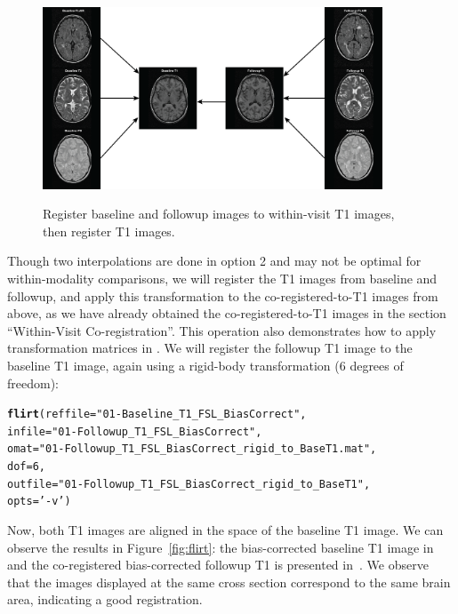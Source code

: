 \documentclass[a4paper]{report}\usepackage[]{graphicx}\usepackage[]{color}
\makeatletter
\newcommand{\hlnum}[1]{\textcolor[rgb]{0.686,0.059,0.569}{#1}}%
\newcommand{\hlstr}[1]{\textcolor[rgb]{0.192,0.494,0.8}{#1}}%
\newcommand{\hlstd}[1]{\textcolor[rgb]{0.345,0.345,0.345}{#1}}%
\newcommand{\hlkwc}[1]{\textcolor[rgb]{0.333,0.667,0.333}{#1}}%
\newcommand{\hlkwd}[1]{\textcolor[rgb]{0.737,0.353,0.396}{\textbf{#1}}}%
\newenvironment{kframe}{%
 \def\at@end@of@kframe{}%
 \ifinner\ifhmode%
  \def\at@end@of@kframe{\end{minipage}}%
  \begin{minipage}{\columnwidth}%
 \fi\fi%
 \def\FrameCommand##1{\hskip\@totalleftmargin \hskip-\fboxsep
 \colorbox{shadecolor}{##1}\hskip-\fboxsep
     \hskip-\linewidth \hskip-\@totalleftmargin \hskip\columnwidth}%
 \MakeFramed {\advance\hsize-\width
   \@totalleftmargin\z@ \linewidth\hsize
   \@setminipage}}%
 {\par\unskip\endMakeFramed%
 \at@end@of@kframe}
\newenvironment{knitrout}{}{} %
\newcommand\gobblepars{%
    \@ifnextchar\par%
        {\expandafter\gobblepars\@gobble}%
        {}}
\let\pkg=\strong
\makeatother
\begin{document}
\begin{article}
\begin{figure}

\includegraphics[width = 0.9\textwidth]{Reg_Figure_Option1.png}
\label{fig:reg}
\caption{Register baseline and followup images to within-visit T1 images, then register T1 images.}
\end{figure}

Though two interpolations are done in option 2 and may not be optimal for within-modality comparisons, we will register the T1 images from baseline and followup, and apply this transformation to the co-registered-to-T1 images from above, as we have already obtained the co-registered-to-T1 images in the section ``Within-Visit Co-registration''.  This operation also demonstrates how to apply transformation matrices in \pkg{fslr}.  We will register the followup T1 image to the baseline T1 image, again using a rigid-body transformation (6 degrees of freedom):

\gobblepars
\begin{knitrout}
\color{fgcolor}\begin{kframe}
\begin{alltt}
\hlkwd{flirt}\hlstd{(}\hlkwc{reffile} \hlstd{=} \hlstr{"01-Baseline_T1_FSL_BiasCorrect"}\hlstd{,}
        \hlkwc{infile} \hlstd{=} \hlstr{"01-Followup_T1_FSL_BiasCorrect"}\hlstd{,}
      \hlkwc{omat} \hlstd{=} \hlstr{"01-Followup_T1_FSL_BiasCorrect_rigid_to_BaseT1.mat"}\hlstd{,}
      \hlkwc{dof} \hlstd{=} \hlnum{6}\hlstd{,}
      \hlkwc{outfile} \hlstd{=} \hlstr{"01-Followup_T1_FSL_BiasCorrect_rigid_to_BaseT1"}\hlstd{,}
      \hlkwc{opts} \hlstd{=} \hlstr{'-v'}\hlstd{)}
\end{alltt}
\end{kframe}
\end{knitrout}
\gobblepars


Now, both T1 images are aligned in the space of the baseline T1 image.  We can observe the results in Figure~\ref{fig:flirt}: the bias-corrected baseline T1 image in~\protect{} and the co-registered bias-corrected followup T1 is presented in~\protect{}.   We observe that the images displayed at the same cross section correspond to the same brain area, indicating a good registration.





\end{article}
\end{document}
